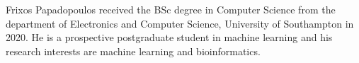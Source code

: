 \documentclass[10pt,journal,compsoc,twoside]{IEEEtran}
\begin{document}
\ifCLASSOPTIONcaptionsoff
  \newpage
\fi







%
%
%



% 

\begin{IEEEbiography}{Frixos Papadopoulos}
received the BSc degree in Computer Science from the department of Electronics and Computer Science, University of Southampton in 2020. He is a prospective postgraduate student in machine learning and his research interests are machine learning and bioinformatics.
\end{IEEEbiography}
\end{document}
